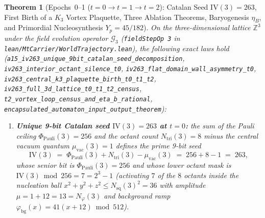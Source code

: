 \documentclass[11pt,a4paper]{article}
\theoremstyle{plain}
\newtheorem{theorem}{Theorem}[section]
\theoremstyle{definition}
\begin{document}
\begin{theorem}[Epochs~0--1 ($t = 0 \to t = 1 \to t = 2$): Catalan Seed $\mathrm{IV}(3) = 263$, First Birth of a $K_3$ Vortex Plaquette, Three Ablation Theorems, Baryogenesis $\eta_B$, and Primordial Nucleosynthesis $Y_p = 45/182$]
\label{thm:first-vortex-birth-iv263}
On the three-dimensional lattice $\mathbb{Z}^3$ under the field evolution operator $\mathcal{G}_3$ (\texttt{fieldStepOp 3} in \texttt{lean/MtCarrier/WorldTrajectory.lean}), the following exact laws hold (\texttt{a15\_iv263\_unique\_9bit\_catalan\_seed\_decomposition}, \texttt{iv263\_interior\_octant\_silence\_t0}, \texttt{iv263\_flat\_domain\_wall\_asymmetry\_t0}, \texttt{iv263\_central\_k3\_plaquette\_birth\_t0\_t1\_t2}, \texttt{iv263\_full\_3d\_lattice\_t0\_t1\_t2\_census}, \texttt{t2\_vortex\_loop\_census\_and\_eta\_b\_rational}, \texttt{encapsulated\_automaton\_input\_output\_theorem}):
\begin{enumerate}[label=\textbf{(\arabic*)},leftmargin=*]
\item \textbf{Unique 9-bit Catalan seed $\mathrm{IV}(3) = 263$ at $t = 0$:}
  the sum of the Pauli ceiling $\Phi_{\mathrm{Pauli}}(3) = 256$ and the octant count $N_{\mathrm{tri}}(3) = 8$ minus the central vacuum quantum $\mu_{\mathrm{vac}}(3) = 1$ defines the prime 9-bit seed
  \begin{equation}
    \label{eq:iv263-seed-def}
    \mathrm{IV}(3) \;=\; \Phi_{\mathrm{Pauli}}(3) + N_{\mathrm{tri}}(3) - \mu_{\mathrm{vac}}(3) \;=\; 256 + 8 - 1 \;=\; 263,
  \end{equation}
  whose senior bit is $\Phi_{\mathrm{Pauli}}(3) = 256$ and whose lower octant mask is $\mathrm{IV}(3) \bmod 256 = 7 = 2^3 - 1$ (activating $7$ of the $8$ octants inside the nucleation ball $x^2 + y^2 + z^2 \le N_{\mathrm{sq}}(3)^2 = 36$ with amplitude $\mu = 1 + 12 = 13 = N_\varphi(3)$ and background ramp $\varphi_{\mathrm{bg}}(x) = 41(x + 12) \bmod 512$).


\end{enumerate}
\end{theorem}
\end{document}
